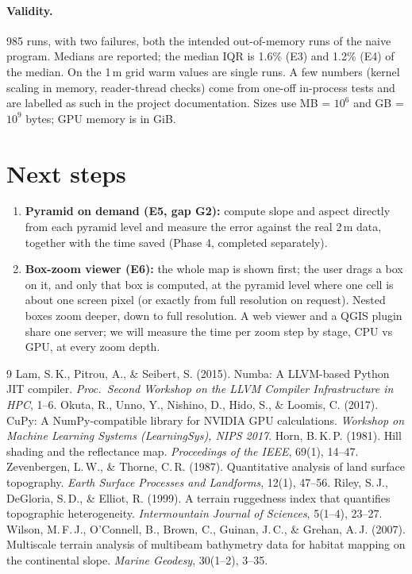 ﻿\documentclass[11pt,a4paper]{article}
\begin{document}
\paragraph{Validity.} 985 runs, with two failures, both the intended out-of-memory runs of the naive program.
Medians are reported; the median IQR is 1.6\% (E3) and 1.2\% (E4) of the median. On the 1\,m grid warm values are
single runs. A few numbers (kernel scaling in memory, reader-thread checks) come from one-off in-process tests and
are labelled as such in the project documentation. Sizes use MB = $10^6$ and GB = $10^9$ bytes; GPU memory is in GiB.

\section{Next steps}
\begin{enumerate}
  \item \textbf{Pyramid on demand (E5, gap G2):} compute slope and aspect directly from each pyramid level and
  measure the error against the real 2\,m data, together with the time saved (Phase 4, completed separately).
  \item \textbf{Box-zoom viewer (E6):} the whole map is shown first; the user drags a box on it, and only that box
  is computed, at the pyramid level where one cell is about one screen pixel (or exactly from full resolution on
  request). Nested boxes zoom deeper, down to full resolution. A web viewer and a QGIS plugin share one server; we
  will measure the time per zoom step by stage, CPU vs GPU, at every zoom depth.
\end{enumerate}

\begin{thebibliography}{9}\small
{} Lam, S.\,K., Pitrou, A., \& Seibert, S. (2015). Numba: A LLVM-based Python JIT compiler.
\emph{Proc.\ Second Workshop on the LLVM Compiler Infrastructure in HPC}, 1--6.
 Okuta, R., Unno, Y., Nishino, D., Hido, S., \& Loomis, C. (2017). CuPy: A NumPy-compatible library
for NVIDIA GPU calculations. \emph{Workshop on Machine Learning Systems (LearningSys), NIPS 2017}.
 Horn, B.\,K.\,P. (1981). Hill shading and the reflectance map. \emph{Proceedings of the IEEE},
69(1), 14--47.
 Zevenbergen, L.\,W., \& Thorne, C.\,R. (1987). Quantitative analysis of land surface topography.
\emph{Earth Surface Processes and Landforms}, 12(1), 47--56.
 Riley, S.\,J., DeGloria, S.\,D., \& Elliot, R. (1999). A terrain ruggedness index that quantifies
topographic heterogeneity. \emph{Intermountain Journal of Sciences}, 5(1--4), 23--27.
 Wilson, M.\,F.\,J., O'Connell, B., Brown, C., Guinan, J.\,C., \& Grehan, A.\,J. (2007).
Multiscale terrain analysis of multibeam bathymetry data for habitat mapping on the continental slope.
\emph{Marine Geodesy}, 30(1--2), 3--35.
\end{thebibliography}
\end{document}
